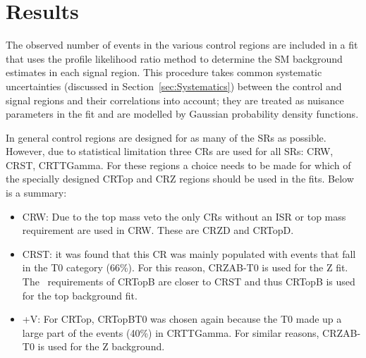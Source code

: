 \chapter{Results}
\label{chap:Results}

The observed number of events in the various control regions are
included in a fit that uses the profile likelihood ratio method to determine the SM background
estimates in each signal region. This procedure takes common
systematic uncertainties (discussed in Section~\ref{sec:Systematics}) between the
control and signal regions and their correlations into account; they are treated as nuisance
parameters in the fit and are modelled by Gaussian probability density
functions.

In general control regions are designed for as many of the SRs as possible. However, due to statistical limitation three CRs are used for all SRs: CRW, CRST, CRTTGamma. For these regions a choice needs to be made for which of the specially designed CRTop and CRZ regions should be used in the fits. Below is a summary:
\begin{itemize}
  \item CRW: Due to the top mass veto the only CRs without an ISR or top mass requirement are used in CRW. These are CRZD and CRTopD. 
  \item CRST: it was found that this CR was mainly populated with events that fall in the T0 category (66\%). For this reason, CRZAB-T0 is used for the Z fit. The \met\ requirements of CRTopB are closer to CRST and thus CRTopB is used for the top background fit. 
  \item \ttbar+V: For CRTop, CRTopBT0 was chosen again because the T0 made up a large part of the events (40\%) in CRTTGamma.
For similar reasons, CRZAB-T0 is used for the Z background.
\end{itemize}

